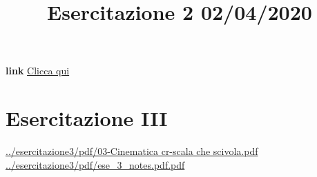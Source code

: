 \title{Esercitazione 2 02/04/2020}\newline
\textbf{link} \href{https://web.microsoftstream.com/video/490e9a91-e0f9-4769-a4ce-f9fc559ed5c1}{Clicca qui}
\section{Esercitazione III}
\url{../esercitazione3/pdf/03-Cinematica cr-scala che scivola.pdf}\newline
\url{../esercitazione3/pdf/ese_3_notes.pdf.pdf}